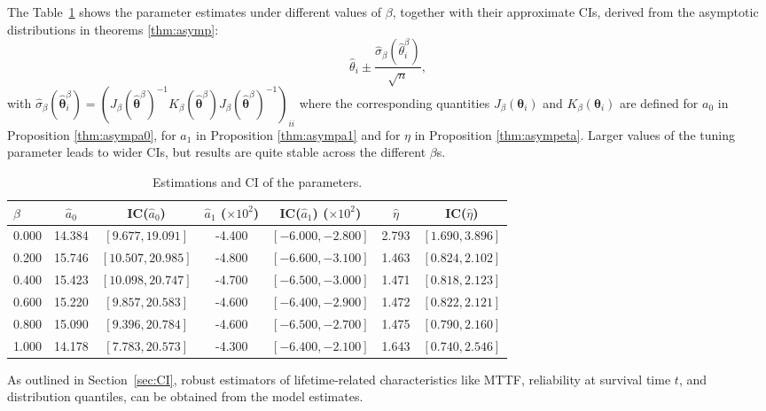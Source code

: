 \documentclass{article}
\begin{document}
The Table~\ref{tab:estimates_and_cis} shows the parameter estimates under different values of $\beta$, together with their approximate CIs, derived from the asymptotic distributions in theorems \ref{thm:asymp}:
\[
\hat{\theta}_i \pm \frac{\widehat{\sigma}_\beta(\widehat{\theta}^\beta_i)}{\sqrt{n}},
\]
with $\widehat{\sigma}_\beta(\widehat{\bm{\theta}}^\beta_i) = \left(J_{\beta}(\widehat{\bm{\theta}}^\beta)^{-1}K_\beta(\widehat{\bm{\theta}}^\beta)J_\beta(\widehat{\bm{\theta}}^\beta)^{-1}\right)_{ii}$ where the corresponding quantities
$J_\beta(\bm{\theta}_i)$ and $K_\beta(\bm{\theta}_i)$ are defined for $a_0$ in Proposition \ref{thm:asympa0}, for $a_1$ in Proposition \ref{thm:asympa1} and for $\eta$ in Proposition \ref{thm:asympeta}.
Larger values of the tuning parameter leads to wider CIs, but results are quite stable across the different $\beta$s.
\begin{table}[htb]
\centering
\caption{Estimations and CI of the parameters.}
\label{tab:estimates_and_cis}
\begin{tabular}{lcccccc}
\toprule
$\beta$ & $\hat{a}_0$ & IC($\hat{a}_0$) & $\hat{a}_1$ ($\times 10^2$) & IC($\hat{a}_1$) ($\times 10^2$) & $\hat{\eta}$ & IC($\hat{\eta}$) \\
\midrule
0.000 & 14.384 & $[9.677, 19.091]$ & -4.400 & $[-6.000, -2.800]$ & 2.793 & $[1.690, 3.896]$ \\
0.200 & 15.746 & $[10.507, 20.985]$ & -4.800 & $[-6.600, -3.100]$ & 1.463 & $[0.824, 2.102]$ \\
0.400 & 15.423 & $[10.098, 20.747]$ & -4.700 & $[-6.500, -3.000]$ & 1.471 & $[0.818, 2.123]$ \\
0.600 & 15.220 & $[9.857, 20.583]$ & -4.600 & $[-6.400, -2.900]$ & 1.472 & $[0.822, 2.121]$ \\
0.800 & 15.090 & $[9.396, 20.784]$ & -4.600 & $[-6.500, -2.700]$ & 1.475 & $[0.790, 2.160]$ \\
1.000 & 14.178 & $[7.783, 20.573]$ & -4.300 & $[-6.400, -2.100]$ & 1.643 & $[0.740, 2.546]$ \\
\bottomrule
\end{tabular}
\end{table}



As outlined in Section~\ref{sec:CI}, robust estimators of lifetime-related characteristics like MTTF, reliability at survival time $t$, and distribution quantiles, can be obtained from the model estimates.
\end{document}
